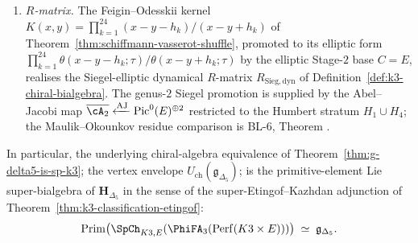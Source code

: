 \begin{theorem}
\begin{enumerate}[label=\textup{(B\arabic*)}]
 \item \label{bialg:rmatrix} \emph{$R$-matrix.} The Feigin--Odesskii kernel $K(x,y) = \prod_{k=1}^{24}(x-y-h_k)/(x-y+h_k)$ of Theorem~\textup{\ref{thm:schiffmann-vasserot-shuffle}}, promoted to its elliptic form $\prod_{k=1}^{24}\theta(x-y-h_k;\tau)/\theta(x-y+h_k;\tau)$ by the elliptic Stage-$2$ base $C = E$, realises the Siegel-elliptic dynamical $R$-matrix $R_{\mathrm{Sieg,dyn}}$ of Definition~\textup{\ref{def:k3-chiral-bialgebra}}. The genus-$2$ Siegel promotion is supplied by the Abel--Jacobi map $\overline{\cA_2} \xleftarrow{\mathrm{AJ}} \mathrm{Pic}^0(E)^{\oplus 2}$ restricted to the Humbert stratum $H_1 \cup H_4$; the Maulik--Okounkov residue comparison is BL-6, Theorem \cite{VolI}.
\end{enumerate}
In particular, the underlying chiral-algebra equivalence of Theorem~\textup{\ref{thm:g-delta5-is-sp-k3}}; the vertex envelope $U_{\mathrm{ch}}(\mathfrak{g}_{\Delta_5})$; is the primitive-element Lie super-bialgebra of $\mathbf{H}_{\Delta_5}$ in the sense of the super-Etingof--Kazhdan adjunction of Theorem~\textup{\ref{thm:k3-classification-etingof}}:
\[
 \mathrm{Prim}\bigl(\SpCh_{K3, E}(\PhiFA_3(\mathrm{Perf}(K3 \times E)))\bigr)
 \;\simeq\; \mathfrak{g}_{\Delta_5}.
\]
\end{theorem}

